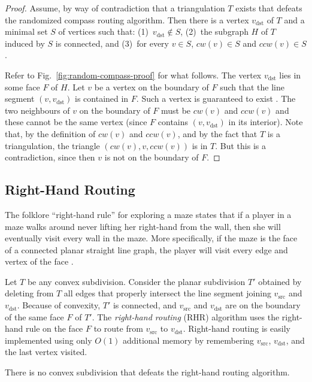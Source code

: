 \documentclass[final]{siamltex}
\newcommand{\seclabel}[1]{\label{sec:#1}}
\newcommand{\figref}[1]{\mbox{Fig.~\ref{fig:#1}}}
\newcommand{\thmlabel}[1]{\label{thm:#1}}
\newcommand{\vsrc}{v_\mathrm{src}}
\newcommand{\vdest}{v_\mathrm{dst}}
\newcommand{\cwcompass}[1]{\mathit{cw}(#1)}
\newcommand{\ccwcompass}[1]{\mathit{ccw}(#1)}
\begin{document}
\begin{proof}
Assume, by way of contradiction that a triangulation $T$ exists that
defeats the randomized compass routing algorithm.  Then there is a
vertex $\vdest$ of $T$ and a minimal set $S$ of vertices such that:
(1)~$\vdest\notin S$, (2)~the subgraph $H$ of $T$ induced by $S$ is
connected, and (3)~for every $v\in S$, $\cwcompass{v}\in S$ and
$\ccwcompass{v}\in S$.

Refer to \figref{random-compass-proof} for what follows.  The vertex
$\vdest$ lies in some face $F$ of $H$.  Let $v$ be a vertex on the
boundary of $F$ such that the line segment $(v,\vdest)$ is contained
in $F$.  Such a vertex is guaranteed to exist \cite{c75}.  The two
neighbours of $v$ on the boundary of $F$ must be $\cwcompass{v}$ and
$\ccwcompass{v}$ and these cannot be the same vertex (since $F$
contains $(v,\vdest)$ in its interior).  Note that, by the definition
of $\cwcompass{v}$ and $\ccwcompass{v}$, and by the fact that $T$ is a
triangulation, the triangle $(\cwcompass{v},v,\ccwcompass{v})$ is in
$T$.  But this is a contradiction, since then $v$ is not on the
boundary of $F$.  
\qquad\end{proof}

\subsection{Right-Hand Routing}\seclabel{righthandrule}

The folklore ``right-hand rule'' for exploring a maze states that if a
player in a maze walks around never lifting her right-hand from the
wall, then she will eventually visit every wall in the maze.  More
specifically, if the maze is the face of a connected planar straight
line graph, the player will visit every edge and vertex of the face
\cite{bm76}.

Let $T$ be any convex subdivision.  Consider the planar subdivision
$T'$ obtained by deleting from $T$ all edges that properly intersect
the line segment joining $\vsrc$ and $\vdest$.  Because of convexity,
$T'$ is connected, and $\vsrc$ and $\vdest$ are on the boundary of the
same face $F$ of $T'$.  The {\em right-hand routing\/} (RHR) algorithm
uses the right-hand rule on the face $F$ to route from $\vsrc$ to
$\vdest$.  Right-hand routing is easily implemented using only $O(1)$
additional memory by remembering $\vsrc$, $\vdest$, and the last
vertex visited.

\begin{theorem}\thmlabel{right-hand}
There is no convex subdivision that defeats the right-hand routing
algorithm.
\end{theorem}
\end{document}
